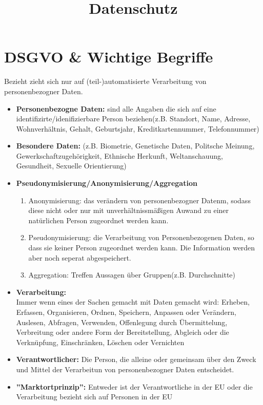 \documentclass[12pt,a4paper]{article}
\title{Datenschutz}
\begin{document}
    \section{DSGVO \& Wichtige Begriffe}
    Bezieht zieht sich nur auf  (teil-)automatisierte Verarbeitung von personenbezogner Daten. \\
    \begin{itemize}
        \item \textbf{Personenbezogne Daten:}
            sind alle Angaben die sich auf eine identifizirte/idenifizierbare Person beziehen(z.B. Standort, Name, Adresse, Wohnverhältnis, Gehalt, Geburtsjahr, Kreditkartennummer, Telefonnummer)
        \item \textbf{Besondere Daten:}
            (z.B. Biometrie, Genetische Daten, Politsche Meinung, Gewerkschaftzugehörigkeit, Ethnische Herkunft, Weltanschauung, Gesundheit, Sexuelle Orientierung)
        \item \textbf{Pseudonymisierung/Anonymisierung/Aggregation}
            \begin{enumerate}
                \item Anonymisierung: das verändern von personenbezogner Datenm, sodass diese nicht oder nur mit unverhältnissmäßigen Auwand zu einer natürlichen Person zugeordnet werden kann.
                \item Pseudonymisierung: die Verarbeitung von Personenbezogenen Daten, so dass sie keiner Person zugeordnet werden kann. Die Information werden aber noch seperat abgespeichert.
                \item Aggregation: Treffen Aussagen über Gruppen(z.B. Durchschnitte)
            \end{enumerate}
        \item \textbf{Verarbeitung:}  \\
            Immer wenn eines der Sachen gemacht mit Daten gemacht wird:
            Erheben, Erfassen, Organisieren, Ordnen, Speichern, Anpassen oder Verändern, Auslesen, Abfragen, Verwenden, Offenlegung durch Übermittelung, Verbreitung oder andere Form der Bereitstellung, Abgleich oder die Verknüpfung, Einschränken, Löschen oder Vernichten
        \item \textbf{Verantwortlicher:}
            Die Person, die alleine oder gemeinsam über den Zweck und Mittel der Verarbeitun von personenbezogner Daten entscheidet.
        \item \textbf{''Marktortprinzip'':}
            Entweder ist der Verantwortliche in der EU oder die Verarbeitung bezieht sich auf Personen in der EU

\end{itemize}
\end{document}
